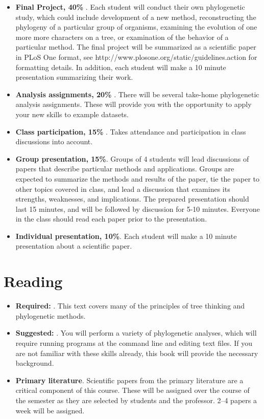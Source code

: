 \documentclass[12pt]{article}
\begin{document}
\begin{itemize}
\item {\bf Final Project, 40\% }. Each student will conduct their own phylogenetic study, which could include development of a new method, reconstructing the phylogeny of a particular group of organisms, examining the evolution of one more more characters on a tree, or examination of the behavior of a particular method. The final project will be summarized as a scientific paper in PLoS One format, see http://www.plosone.org/static/guidelines.action for formatting details. In addition, each student will make a 10 minute presentation summarizing their work.

\item {\bf Analysis assignments, 20\% }. There will be several take-home phylogenetic analysis assignments. These will provide you with the opportunity to apply your new skills to example datasets.

\item {\bf Class participation, 15\% }. Takes attendance and participation in class discussions into account.

\item {\bf Group presentation, 15\%}. Groups of 4 students will lead discussions of papers that describe particular methods and applications. Groups are expected to summarize the methods and results of the paper, tie the paper to other topics covered in class, and lead a discussion that examines its strengths, weaknesses, and implications. The prepared presentation should last 15 minutes, and will be followed by discussion for 5-10 minutes. Everyone in the class should read each paper prior to the presentation.

\item {\bf Individual presentation, 10\%}. Each student will make a 10 minute presentation about a scientific paper.


\end{itemize}


\section*{Reading}

\begin{itemize}
\item {\bf Required: }. This text covers many of the principles of tree thinking and phylogenetic methods.
\item {\bf Suggested: }. You will perform a variety of phylogenetic analyses, which will require running programs at the command line and editing text files. If you are not familiar with these skills already, this book will provide the necessary background.
\item {\bf Primary literature}. Scientific papers from the primary literature are a critical component of this course. These will be assigned over the course of the semester as they are selected by students and the professor. 2--4 papers a week will be assigned.

\end{itemize}
\end{document}
